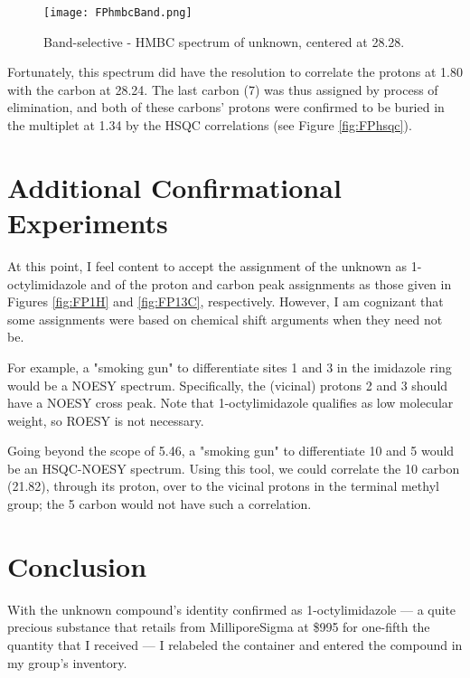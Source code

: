 \documentclass[titlepage]{article}
\begin{document}
\begin{figure}[H]
    \centering
    \texttt{[image: FPhmbcBand.png]}
    \caption{Band-selective - HMBC spectrum of unknown, centered at \SI{28.28}{\partspermillion}.}
    \label{fig:FPhmbcBand}
\end{figure}
Fortunately, this spectrum did have the resolution to correlate the protons at \SI{1.80}{\partspermillion} with the carbon at \SI{28.24}{\partspermillion}. The last carbon (7) was thus assigned by process of elimination, and both of these carbons' protons were confirmed to be buried in the multiplet at \SI{1.34}{\partspermillion} by the HSQC correlations (see Figure \ref{fig:FPhsqc}).



\section{Additional Confirmational Experiments}
At this point, I feel content to accept the assignment of the unknown as 1-octylimidazole and of the proton and carbon peak assignments as those given in Figures \ref{fig:FP1H} and \ref{fig:FP13C}, respectively. However, I am cognizant that some assignments were based on chemical shift arguments when they need not be.\par
For example, a "smoking gun" to differentiate sites 1 and 3 in the imidazole ring would be a NOESY spectrum. Specifically, the (vicinal) protons 2 and 3 should have a NOESY cross peak. Note that 1-octylimidazole qualifies as low molecular weight, so ROESY is not necessary.\par
Going beyond the scope of 5.46, a "smoking gun" to differentiate 10 and 5 would be an HSQC-NOESY spectrum. Using this tool, we could correlate the 10 carbon (\SI{21.82}{\partspermillion}), through its proton, over to the vicinal protons in the terminal methyl group; the 5 carbon would not have such a correlation.



\section{Conclusion}
With the unknown compound's identity confirmed as 1-octylimidazole --- a quite precious substance that retails from MilliporeSigma\supercite{bib:FPSigma} at \$995 for one-fifth the quantity that I received --- I relabeled the container and entered the compound in my group's inventory.
\newpage



\printbibliography[heading=bibintoc]
\end{document}

